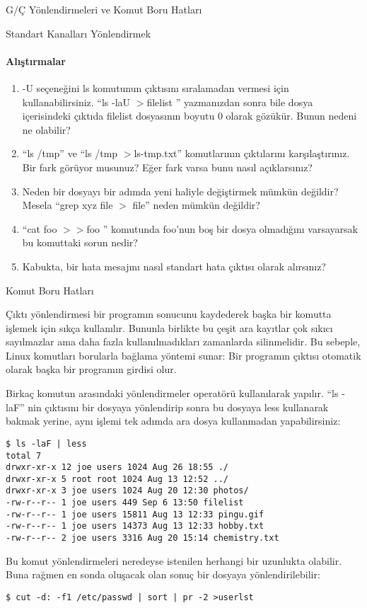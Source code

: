 \begin{section}{G/Ç Yönlendirmeleri ve Komut Boru Hatları}
\begin{subsection}{Standart Kanalları Yönlendirmek}
\paragraph{{\Huge{\PencilLeftDown}}Alıştırmalar}{
\begin{enumerate}
 \item -U seçeneğini ls komutunun çıktısını sıralamadan vermesi için kullanabilirsiniz. “ls -laU $>$filelist ” yazmanızdan sonra bile dosya içerisindeki çıktıda filelist dosyasının boyutu 0 olarak gözükür. Bunun nedeni ne olabilir?
 \item “ls /tmp” ve “ls /tmp $>$ls-tmp.txt” komutlarının çıktılarını karşılaştırınız. Bir fark görüyor musunuz? Eğer fark varsa bunu nasıl açıklarsınız?
 \item Neden bir dosyayı bir adımda yeni haliyle değiştirmek mümkün değildir? Mesela “grep xyz file $>$ file” neden mümkün değildir?
\item “cat foo $>>$foo ” komutunda foo'nun boş bir dosya olmadığını varsayarsak bu komuttaki sorun nedir?
\item Kabukta, bir hata mesajını nasıl standart hata çıktısı olarak alırsınız?
\end{enumerate}}
\end{subsection}
\begin{subsection}{Komut Boru Hatları}

Çıktı yönlendirmesi bir programın sonucunu kaydederek başka bir komutta işlemek için sıkça kullanılır. Bununla birlikte bu çeşit ara kayıtlar çok sıkıcı sayılmazlar ama daha fazla kullanılmadıkları zamanlarda silinmelidir. Bu sebeple, Linux komutları borularla bağlama yöntemi sunar: Bir programın çıktısı otomatik olarak başka bir programın girdisi olur.

Birkaç komutun arasındaki yönlendirmeler \textbar  operatörü kullanılarak yapılır.  “ls -laF” nin çıktısını bir dosyaya yönlendirip sonra bu dosyaya less kullanarak bakmak yerine, aynı işlemi tek adımda ara dosya kullanmadan yapabilirsiniz:
\begin{verbatim}
$ ls -laF | less
total 7
drwxr-xr-x 12 joe users 1024 Aug 26 18:55 ./
drwxr-xr-x 5 root root 1024 Aug 13 12:52 ../
drwxr-xr-x 3 joe users 1024 Aug 20 12:30 photos/
-rw-r--r-- 1 joe users 449 Sep 6 13:50 filelist
-rw-r--r-- 1 joe users 15811 Aug 13 12:33 pingu.gif
-rw-r--r-- 1 joe users 14373 Aug 13 12:33 hobby.txt
-rw-r--r-- 2 joe users 3316 Aug 20 15:14 chemistry.txt
\end{verbatim}

Bu komut yönlendirmeleri neredeyse istenilen herhangi bir uzunlukta olabilir. Buna rağmen en sonda oluşacak olan sonuç bir dosyaya yönlendirilebilir:
\begin{verbatim}
$ cut -d: -f1 /etc/passwd | sort | pr -2 >userlst
\end{verbatim}


\end{subsection}
\end{section}
